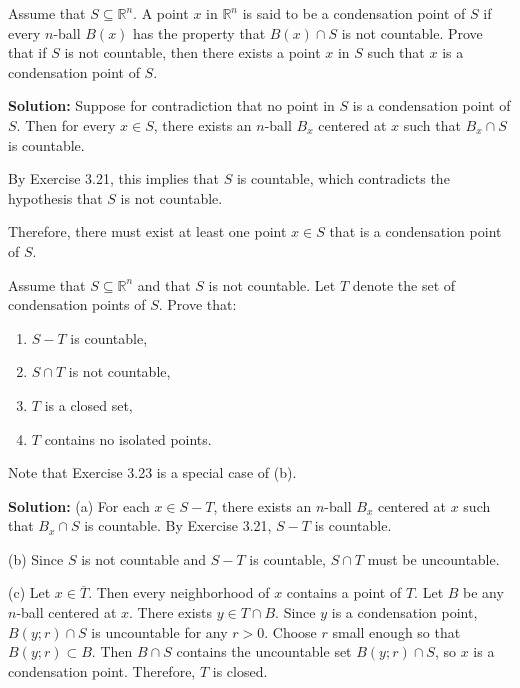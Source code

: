 \begin{problembox}
Assume that \( S \subseteq \mathbb{R}^n \). A point \( x \) in \( \mathbb{R}^n \) is said to be a condensation point of \( S \) if every \( n \)-ball \( B(x) \) has the property that \( B(x) \cap S \) is not countable. Prove that if \( S \) is not countable, then there exists a point \( x \) in \( S \) such that \( x \) is a condensation point of \( S \).
\end{problembox}

\textbf{Solution:} Suppose for contradiction that no point in $S$ is a condensation point of $S$. Then for every $x \in S$, there exists an $n$-ball $B_x$ centered at $x$ such that $B_x \cap S$ is countable.

By Exercise 3.21, this implies that $S$ is countable, which contradicts the hypothesis that $S$ is not countable.

Therefore, there must exist at least one point $x \in S$ that is a condensation point of $S$.

\begin{problembox}
Assume that \( S \subseteq \mathbb{R}^n \) and that \( S \) is not countable. Let \( T \) denote the set of condensation points of \( S \). Prove that:
\begin{enumerate}[label=\alph*)]
\item \( S - T \) is countable,
\item \( S \cap T \) is not countable,
\item \( T \) is a closed set,
\item \( T \) contains no isolated points.
\end{enumerate}
Note that Exercise 3.23 is a special case of (b).
\end{problembox}

\textbf{Solution:} 
(a) For each $x \in S - T$, there exists an $n$-ball $B_x$ centered at $x$ such that $B_x \cap S$ is countable. By Exercise 3.21, $S - T$ is countable.

(b) Since $S$ is not countable and $S - T$ is countable, $S \cap T$ must be uncountable.

(c) Let $x \in \overline{T}$. Then every neighborhood of $x$ contains a point of $T$. Let $B$ be any $n$-ball centered at $x$. There exists $y \in T \cap B$. Since $y$ is a condensation point, $B(y;r) \cap S$ is uncountable for any $r > 0$. Choose $r$ small enough so that $B(y;r) \subset B$. Then $B \cap S$ contains the uncountable set $B(y;r) \cap S$, so $x$ is a condensation point. Therefore, $T$ is closed.

